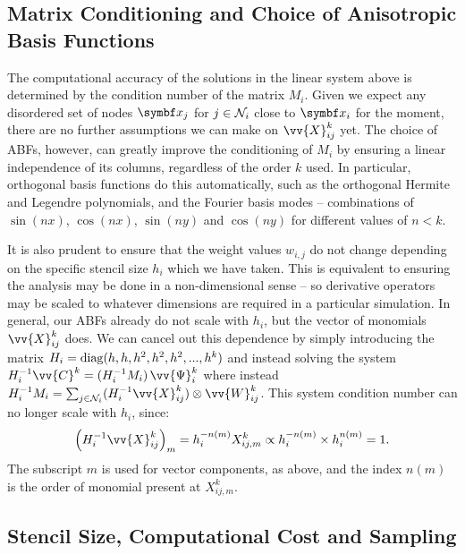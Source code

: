 \subsection{Matrix Conditioning and Choice of Anisotropic Basis Functions}

The computational accuracy of the solutions in the linear system above is determined by the condition number of the matrix $M_i$. Given we expect any disordered set of nodes $\vb{x}_j$ for $j \in \cl{N}_i$ close to $\vb{x}_i$ for the moment, there are no further assumptions we can make on $\vv{X}^k_{ij}$ yet. The choice of ABFs, however, can greatly improve the conditioning of $M_i$ by ensuring a linear independence of its columns, regardless of the order $k$ used. In particular, orthogonal basis functions do this automatically, such as the orthogonal Hermite and Legendre polynomials, and the Fourier basis modes -- combinations of $\sin(nx)$, $\cos(nx)$, $\sin(ny)$ and $\cos(ny)$ for different values of $n < k$.

It is also prudent to ensure that the weight values $w_{i ,j}$ do not change depending on the specific stencil size $h_i$ which we have taken. This is equivalent to ensuring the analysis may be done in a non-dimensional sense -- so derivative operators may be scaled to whatever dimensions are required in a particular simulation. In general, our ABFs already do not scale with $h_i$, but the vector of monomials $\vv{X}^k_{ij}$ does. We can cancel out this dependence by simply introducing the matrix $H_i = \rm{diag}(h, h, h^2, h^2, h^2, ..., h^k)$ and instead solving the system $H_i^{-1} \vv{C}^k = (H_i^{-1} M_i) \, \vv{\Psi}^k_i$ where instead $H_i^{-1} M_i = \sum_{j \in \cl{N}_i} (H_i^{-1} \vv{X}^k_{ij}) \otimes \vv{W}^k_{ij}$. This system condition number can no longer scale with $h_i$, since:
\begin{equation}
\left( H_i^{-1} \vv{X}^k_{ij} \right)_m
= h_i^{-n(m)} X^k_{ij, m}
\propto h_i^{-n(m)} \times h_i^{n(m)} = 1.
\end{equation}
The subscript $m$ is used for vector components, as above, and the index $n(m)$ is the order of monomial present at $X^k_{ij, m}$.



\subsection{Stencil Size, Computational Cost and Sampling}

